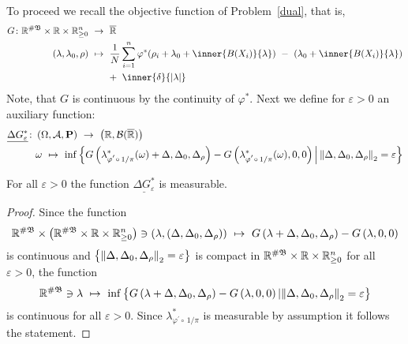 To proceed we recall the objective function of Problem~\ref{dual}, that is,
\begin{align*}
  G\colon
  \R^{\#\mathfrak{B}}
  \times
  \R
  \times
  \R^n_{\ge 0}
  &
  \ 
  \to
  \ 
  \overline{\R}
  \\
  \left( 
    \lambda,
    \lambda_0,
    \rho
  \right)
  &
  \ 
  \mapsto
  \ 
    \frac{1}{N}
\sum_{i=1} 
  ^n
  \varphi^*
  \!
  \left( 
    \rho_i
    +
\lambda_0
+
\inner
{B(X_i)}
{
\lambda
}
  \right)
  \ 
  -
  \ 
  \left( 
\lambda_0
+
\inner
{B(X_i)}
{
\lambda
}
  \right)
  \\
  &
  \qquad 
+
\ 
\inner
{\delta}
{
  |\lambda|
}
\end{align*}
Note, that $G$ is continuous by the continuity of $\varphi^*$.
Next we define for $\varepsilon>0$ an auxiliary function:
   \begin{align*}
     \underline{
     \Delta G^*
     _\varepsilon
     }
     \colon
     &
     \left( \Omega,\mathcal{A},\P \right)
     \ 
     \to
     \ 
     \left( 
       \R,\mathcal{B}(\overline{\R})
     \right)
     \\
     &
     \omega
     \ 
     \mapsto
     \ 
   \inf
   \left\{ 
 G
   \left( 
\lambda^*_{\varphi^{'}\circ\,1/\pi}
(\omega)
+\Delta
,
\Delta_0
,
\Delta_\rho
   \right)
   -
   G
   \left(
\lambda^*_{\varphi^{'}\circ\,1/\pi}
(\omega)
,0,0
   \right)
   \Big\lvert
   \norm{
\Delta
,
\Delta_0
,
\Delta_\rho
   }_2
   =\varepsilon
   \right\}
   \end{align*}
\begin{lemma}
  \label{G_meas}
  For all $\varepsilon>0$ the function
  $
     \underline{
     \Delta G^*
     _\varepsilon
     }
  $
  is measurable.
\end{lemma}
\begin{proof}
  Since the function
  \begin{align*}
    \R^{\#\mathfrak{B}}
    \times
    \left( 
    \R^{\#\mathfrak{B}}
    \times
    \R
    \times
    \R^n_{\ge 0}
    \right)
    \ni
    \left( 
    \lambda,(\Delta,\Delta_0,\Delta_\rho)
    \right)
    \ 
    \mapsto
    \ 
 G
   \left( 
     \lambda
+\Delta
,
\Delta_0
,
\Delta_\rho
   \right)
   -
   G
   \left(
     \lambda
,0,0
   \right)
  \end{align*}
  is continuous and 
  $
  \left\{
   \left\lVert
\Delta
,
\Delta_0
,
\Delta_\rho
   \right\rVert_2
   =\varepsilon
  \right\}
  $
  is compact in 
  $
    \mathbb{R}^{\#\mathfrak{B}}
    \times
    \mathbb{R}
    \times
    \mathbb{R}^n_{\ge 0}
    $
    for all $\varepsilon>0$,
  the function
\begin{align*}
    \R^{\#\mathfrak{B}}
    \ni
    \lambda
    \ 
    \mapsto
    \ 
    \inf
    \left\{ 
  G
   \left( 
     \lambda
+\Delta
,
\Delta_0
,
\Delta_\rho
   \right)
   -
   G
   \left(
     \lambda
,0,0
   \right)
   \lvert
   \norm{
\Delta
,
\Delta_0
,
\Delta_\rho
   }_2
   =\varepsilon
    \right\}
   \end{align*}
is continuous for all $\varepsilon>0$.
Since 
$
\lambda^*_{\varphi^{'}\circ\,1/\pi}
$
is measurable by assumption it follows the statement.
\end{proof}
